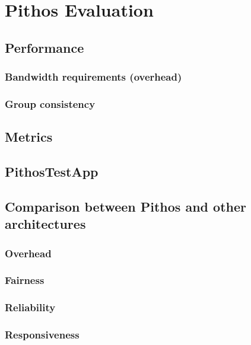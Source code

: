 \chapter{Pithos Evaluation}
    \label{chp:EVALUATION}

    \section{Performance}

    \subsection{Bandwidth requirements (overhead)}

        \subsection{Group consistency}

    \section{Metrics}

    \section{PithosTestApp}

    \section{Comparison between Pithos and other architectures}

        \subsection{Overhead}
        \subsection{Fairness}
        \subsection{Reliability}
        \subsection{Responsiveness}
